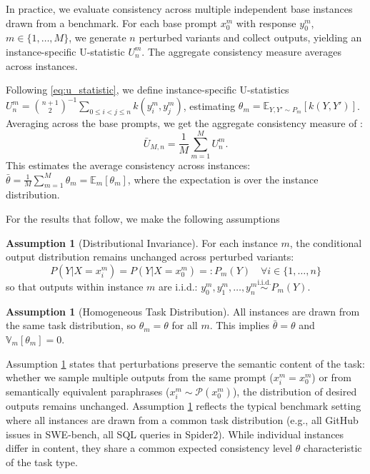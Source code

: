 \documentclass{article}
\theoremstyle{plain}
\theoremstyle{definition}
\newtheorem{assumption}[theorem]{Assumption}
\theoremstyle{remark}
\begin{document}
In practice, we evaluate consistency across multiple independent base instances drawn from a benchmark. For each base prompt $x_0^m$ with response $y_0^m$, $m \in \{1, \ldots, M\}$, we generate $n$ perturbed variants and collect outputs, yielding an instance-specific U-statistic $U_n^m$. The aggregate consistency measure averages across instances.

Following \eqref{eq:u_statistic}, we define instance-specific U-statistics $U_n^m = \binom{n+1}{2}^{-1} \sum_{0 \leq i < j \leq n} k(y_i^m, y_j^m) $, estimating $ \theta_m = \mathbb E_{Y, Y' \sim P_m}[k(Y, Y')] $. Averaging across the base prompts, we get the aggregate consistency measure of \cite{raj2023measuringreliabilitylargelanguage}:
%
\begin{equation}
    \bar{U}_{M,n} = \frac{1}{M} \sum_{m=1}^M U_n^m.
    \label{eq:avg_ustat}
\end{equation}
%
This estimates the average consistency across instances: $ \bar{\theta} = \frac{1}{M} \sum_{m=1}^M \theta_m = \mathbb E_m[\theta_m] $, where the expectation is over the instance distribution.

For the results that follow, we make the following assumptions
\begin{assumption}[Distributional Invariance]
\label{assum:invariance}
For each instance $m$, the conditional output distribution remains unchanged across perturbed variants:
\begin{equation}
    P(Y|X=x_i^m) = P(Y|X=x_0^m) =: P_m(Y) \quad \forall i \in \{1, \ldots, n\}
    \label{eq:invariance}
\end{equation}
so that outputs within instance $m$ are i.i.d.: $y_0^m, y_1^m, \ldots, y_n^m \overset{\text{i.i.d.}}{\sim} P_m(Y)$.
\end{assumption}

\begin{assumption}[Homogeneous Task Distribution]
\label{assum:homogeneous}
All instances are drawn from the same task distribution, so $\theta_m = \theta$ for all $m$. This implies $\bar{\theta} = \theta$ and $\mathbb V_m[\theta_m] = 0$.
\end{assumption}

Assumption \ref{assum:invariance} states that perturbations preserve the semantic content of the task: whether we sample multiple outputs from the same prompt ($x_i^m = x_0^m$) or from semantically equivalent paraphrases ($x_i^m \sim \mathcal{P}(x_0^m)$), the distribution of desired outputs remains unchanged. Assumption \ref{assum:homogeneous} reflects the typical benchmark setting where all instances are drawn from a common task distribution (e.g., all GitHub issues in SWE-bench, all SQL queries in Spider2). While individual instances differ in content, they share a common expected consistency level $\theta$ characteristic of the task type. %
\end{document}
